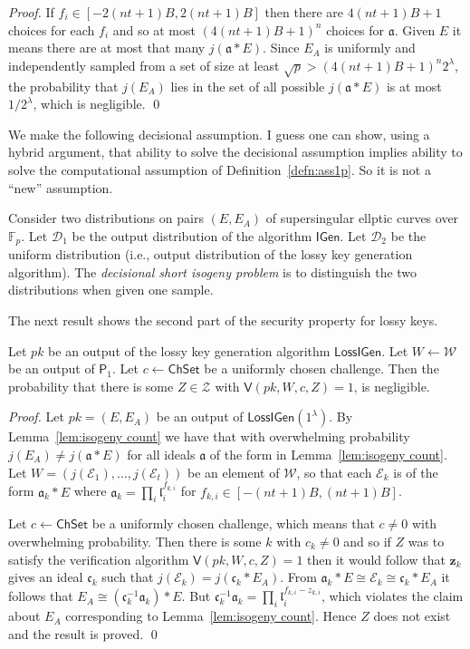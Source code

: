 \documentclass{llncs}
\newcommand{\D}{\mathcal{D}}
\newcommand{\E}{\mathcal{E}}
\newcommand{\F}{\mathbb{F}}
\renewcommand{\a}{\mathfrak{a}}
\renewcommand{\c}{\mathfrak{c}}
\renewcommand{\l}{\mathfrak{l}}
\newcommand{\z}{\mathbf{z}}
\newcommand{\IGen}{\mathsf{IGen}}
\newcommand{\PP}{\mathsf{P}}
\newcommand{\VV}{\mathsf{V}}
\newcommand{\Wset}{\mathcal{W}}
\newcommand{\Zset}{\mathcal{Z}}
\newcommand{\ChSet}{\textsf{ChSet}}
\newcommand{\LossIGen}{\mathsf{LossIGen}}
\begin{document}
\begin{proof}
If $f_i \in [-2(nt+1)B,2(nt+1)B]$ then there are $4(nt+1)B + 1$ choices for each $f_i$ and so at most $(4 (nt+1)B + 1)^{n}$ choices for $\a$.
Given $E$ it means there are at most that many $j( \a * E )$. Since $E_A$ is uniformly and independently sampled from a set of size at least $\sqrt{p} > (4 (nt+1)B + 1)^{n} 2^\lambda$, the probability that $j(E_A)$ lies in the set of all possible $j( \a * E )$ is at most $1/2^\lambda$, which is negligible. \qed
\end{proof}

We make the following decisional assumption.
I guess one can show, using a hybrid argument, that ability to solve the decisional assumption implies ability to solve the computational assumption of Definition~\ref{defn:ass1p}. So it is not a ``new'' assumption.

\begin{definition}
Consider two distributions on pairs $(E, E_A)$ of supersingular ellptic curves over $\F_p$.
Let $\D_1$ be the output distribution of the algorithm $\IGen$.
Let $\D_2$ be the uniform distribution (i.e., output distribution of the lossy key generation algorithm).
The \emph{decisional short isogeny problem} is to distinguish the two distributions when given one sample.
\end{definition}

The next result shows the second part of the security property for lossy keys.

\begin{lemma}
Let $pk$ be an output of the lossy key generation algorithm $\LossIGen$.
Let $W \leftarrow \Wset$ be an output of $\PP_1$.
Let $c \leftarrow \ChSet$ be a uniformly chosen challenge.
Then the probability that there is some $Z \in \Zset$ with $\VV( pk, W, c, Z ) = 1$, is negligible.
\end{lemma}

\begin{proof}
Let $pk = (E, E_A )$ be an output of $\LossIGen( 1^\lambda )$.
By Lemma~\ref{lem:isogeny count} we have that with overwhelming probability $j(E_A) \ne j( \a * E )$ for all ideals $\a$ of the form in Lemma~\ref{lem:isogeny count}.
Let $W = (j(\E_1), \dots, j(\E_t) )$ be an element of $\Wset$, so that each $\E_k$ is of the form $\a_k * E$ where $\a_k = \prod_i \l_i^{f_{k,i}}$ for $f_{k,i} \in [-(nt+1)B, (nt+1)B ]$.


Let $c \leftarrow \ChSet$ be a uniformly chosen challenge, which means that $c \ne 0$ with overwhelming probability.
Then there is some $k$ with $c_k \ne 0$ and so if $Z$ was to satisfy the verification algorithm
$\VV( pk, W, c, Z ) = 1$ then it would follow that $\z_k$ gives an ideal $\c_k$ such that $j(\E_k) = j( \c_k * E_A )$.
From $\a_k * E  \cong \E_k \cong \c_k * E_A$ it follows that $E_A \cong (\c_k^{-1} \a_k ) * E$.
But $\c_k^{-1} \a_k = \prod_i \l_i^{f_{k,i} - z_{k,i}}$, which violates the claim about $E_A$ corresponding to Lemma~\ref{lem:isogeny count}. Hence $Z$ does not exist and the result is proved. \qed
\end{proof}
\end{document}
